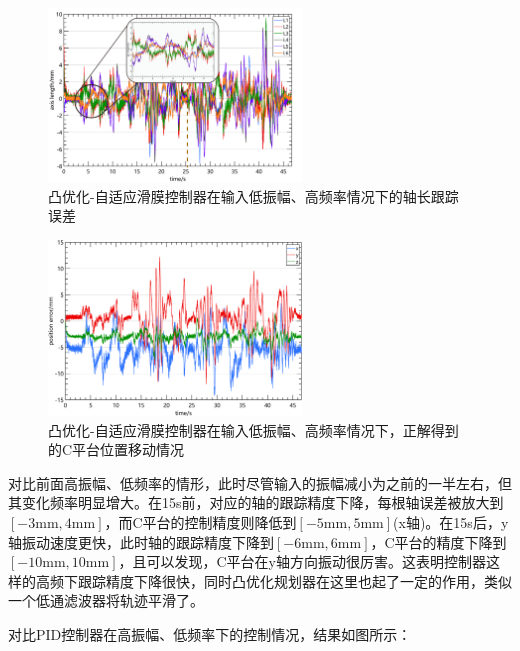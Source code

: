\begin{figure}[H]
    \centering
    \includegraphics[width=0.6\textwidth]{imgs/Experiment/C-AL-FM_1_axis_diff_length.png}
    \caption{凸优化-自适应滑膜控制器在输入低振幅、高频率情况下的轴长跟踪误差}
    \label{fig:C-AL-FM_1_axis_diff_length}
\end{figure}

\begin{figure}[H]
    \centering
    \includegraphics[width=0.6\textwidth]{imgs/Experiment/C-AL-FM_1_c_movement.png}
    \caption{凸优化-自适应滑膜控制器在输入低振幅、高频率情况下，正解得到的C平台位置移动情况}
    \label{fig:C-AL-FM_1_c_movement}
\end{figure}

对比前面高振幅、低频率的情形，此时尽管输入的振幅减小为之前的一半左右，但其变化频率明显增大。在15s前，对应的轴的跟踪精度下降，每根轴误差被放大到
$\left[ -3\mathrm{mm},4\mathrm{mm} \right] $，而C平台的控制精度则降低到$\left[ -5\mathrm{mm},5\mathrm{mm} \right] $(x轴)。在15s后，y轴振动速度更快，此时轴的跟踪精度下降到$\left[ -6\mathrm{mm},6\mathrm{mm} \right] $，C平台的精度下降到$\left[ -10\mathrm{mm},10\mathrm{mm} \right] $，且可以发现，C平台在y轴方向振动很厉害。这表明控制器这样的高频下跟踪精度下降很快，同时凸优化规划器在这里也起了一定的作用，类似一个低通滤波器将轨迹平滑了。

对比PID控制器在高振幅、低频率下的控制情况，结果如图所示：

